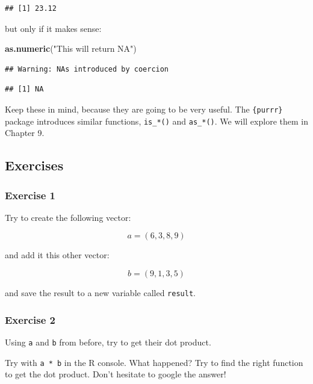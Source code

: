 \documentclass[]{gitbook}
\newenvironment{Shaded}{\begin{snugshade}}{\end{snugshade}}
\newcommand{\KeywordTok}[1]{\textcolor[rgb]{0.13,0.29,0.53}{\textbf{#1}}}
\newcommand{\NormalTok}[1]{#1}
\newcommand{\StringTok}[1]{\textcolor[rgb]{0.31,0.60,0.02}{#1}}
\theoremstyle{definition}
\theoremstyle{definition}
\theoremstyle{definition}
\theoremstyle{remark}
\begin{document}
\begin{verbatim}
## [1] 23.12
\end{verbatim}

but only if it makes sense:

\begin{Shaded}
\begin{Highlighting}[]
\KeywordTok{as.numeric}\NormalTok{(}\StringTok{"This will return NA"}\NormalTok{)}
\end{Highlighting}
\end{Shaded}

\begin{verbatim}
## Warning: NAs introduced by coercion
\end{verbatim}

\begin{verbatim}
## [1] NA
\end{verbatim}

Keep these in mind, because they are going to be very useful. The
\texttt{\{purrr\}} package introduces similar functions,
\texttt{is\_*()} and \texttt{as\_*()}. We will explore them in Chapter
9.

\hypertarget{exercises-1}{%
\subsection{Exercises}\label{exercises-1}}

\hypertarget{exercise-1-1}{%
\subsubsection*{Exercise 1}\label{exercise-1-1}}

Try to create the following vector:

\[a = (6,3,8,9)\]

and add it this other vector:

\[b = (9,1,3,5)\]

and save the result to a new variable called \texttt{result}.

\hypertarget{exercise-2}{%
\subsubsection*{Exercise 2}\label{exercise-2}}

Using \texttt{a} and \texttt{b} from before, try to get their dot
product.

Try with \texttt{a\ *\ b} in the R console. What happened? Try to find
the right function to get the dot product. Don't hesitate to google the
answer!
\end{document}
